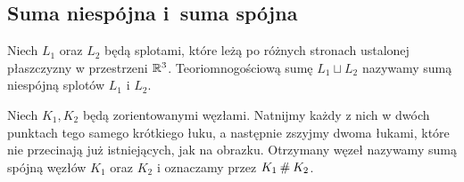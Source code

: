 
\subsection{Suma niespójna i~suma spójna}

\begin{definition}
%
    Niech $L_1$ oraz $L_2$ będą splotami, które leżą po różnych stronach ustalonej płaszczyzny w przestrzeni $\mathbb R^3$.
    Teoriomnogościową sumę $L_1 \sqcup L_2$ nazywamy sumą niespójną splotów $L_1$ i $L_2$.
\end{definition}

\begin{definition}
%
\label{def:connected_sum}%
    Niech $K_1, K_2$ będą zorientowanymi węzłami.
    Natnijmy każdy z nich w dwóch punktach tego samego krótkiego łuku, a następnie zszyjmy dwoma łukami, które nie przecinają już istniejących, jak na obrazku.
    Otrzymany węzeł nazywamy sumą spójną węzłów $K_1$ oraz $K_2$ i oznaczamy przez $K_1 \mathbin{\#} K_2$.
\begin{comment}
    \[
        \begin{tikzpicture}[baseline=-0.65ex,scale=0.09]
        \useasboundingbox (-12, -15) rectangle (12, 10);
        \begin{knot}[clip width=5, flip crossing/.list={5}, ignore endpoint intersections=false,]
            \strand[thick] (-3.5, -3.5) [in=down, out=up] to (3.5, 3.5);
            \strand[thick] (3.5, 3.5) [in=right, out=up] to (-4.5, 10);
            \strand[thick] (-4.5, 10) [in=up, out=left] to (-10, 3.5);
            \strand[thick] (-10, 3.5) to (-10, -3.5);
            \strand[thick] (-10, -3.5) [in=left, out=down] to (-4.5, -10);
            \strand[thick] (-4.5, -10) [in=down, out=right] to (3.5, -3.5);
            \strand[thick] (3.5, -3.5) [in=down, out=up] to (-3.5, 3.5);
            \strand[thick] (-3.5, 3.5) [in=left, out=up] to (4.5, 10);
            \strand[thick] (4.5, 10) [in=up, out=right] to (10, 3.5);
            \strand[thick, -Latex] (10, 3.5) to (10, -3.5);
            \strand[thick] (10, -3.5) [in=right, out=down] to (4.5, -10);
            \strand[thick] (4.5, -10) [in=down, out=left] to (-3.5, -3.5);
            \node at (0, -15) {$K_1$};
        \end{knot}
        \end{tikzpicture}
        \shrap
        \begin{tikzpicture}[baseline=-0.65ex,scale=0.09]

\end{comment}
\end{definition}
